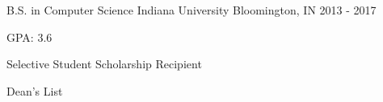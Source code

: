\begin{cventries}
  \cventry
    {B.S. in Computer Science}
    {Indiana University}
    {Bloomington, IN}
    {2013 - 2017}
    {
      \begin{cvitems}
        \item {GPA: 3.6}
        \item {Selective Student Scholarship Recipient}
        \item {Dean’s List}
      \end{cvitems}
    }
\end{cventries}
